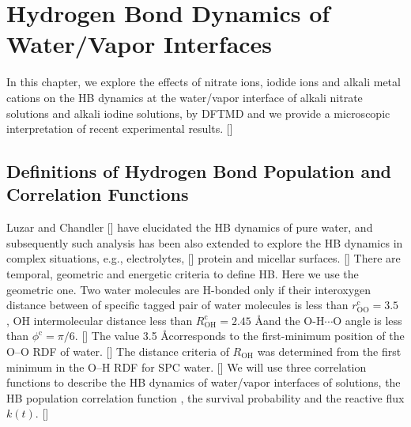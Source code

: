 \chapter{Hydrogen Bond Dynamics of Water/Vapor Interfaces }\label{CHAPTER_HB}
In this chapter, we explore the effects of nitrate ions, iodide ions and alkali metal cations 
on the HB dynamics at the water/vapor interface of alkali nitrate solutions and alkali
iodine solutions, by DFTMD 
and we provide a microscopic interpretation of recent experimental results. [\cite{HuaWei2014}]

\section{Definitions of Hydrogen Bond Population and Correlation Functions}
Luzar and Chandler [\cite{AL96}] have elucidated the HB dynamics of pure water, and
subsequently such analysis has been also extended to explore the HB dynamics
in complex situations, e.g., electrolytes, [\cite{AC00}] protein and  micellar surfaces. [\cite{SP05}]
There are temporal, geometric and energetic criteria to define HB. Here we use the geometric one.
Two water molecules are H-bonded only if their interoxygen distance between of specific tagged pair of water molecules 
is less than $r^{\text{c}}_{\text{OO}}=3.5$ \A, OH intermolecular distance less than $R^{\text{c}}_{\text{OH}}=2.45$ \AA and 
the O-H$\cdots$O angle is less than $\phi^{\text{c}}=\pi/6$. [\cite{AKS86,JT90,SB02}] 
The value 3.5 \AA corresponds to the first-minimum position of the O--O RDF of water. [\cite{Sciortino1989}]   
The distance criteria of $R_{\text{OH}}$  was determined from the first minimum in the O--H RDF for SPC water. [\cite{HJCB81}]
We will use three correlation functions to describe the HB dynamics of water/vapor interfaces of solutions,
the HB population correlation function \CHB, the survival probability \SHB and the reactive flux $k(t)$. [\cite{DCR83}]

